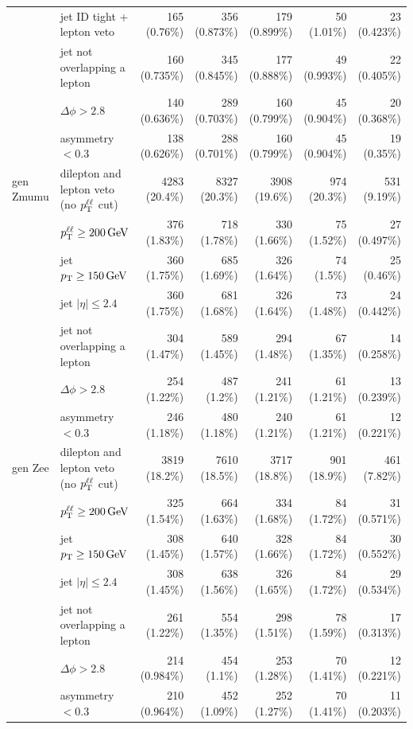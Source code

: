 \begin{tabular}{llrrrrr}
 & jet ID tight + lepton veto & 165 (0.76\%) & 356 (0.873\%) & 179 (0.899\%) & 50 (1.01\%) & 23 (0.423\%) \\
 & jet not overlapping a lepton & 160 (0.735\%) & 345 (0.845\%) & 177 (0.888\%) & 49 (0.993\%) & 22 (0.405\%) \\
 & $\Delta\phi > 2.8$ & 140 (0.636\%) & 289 (0.703\%) & 160 (0.799\%) & 45 (0.904\%) & 20 (0.368\%) \\
 & asymmetry $< 0.3$ & 138 (0.626\%) & 288 (0.701\%) & 160 (0.799\%) & 45 (0.904\%) & 19 (0.35\%) \\
\midrule
gen Zmumu & dilepton and lepton veto (no $p_{\mathrm{T}}^{\ell\ell}$ cut) & 4283 (20.4\%) & 8327 (20.3\%) & 3908 (19.6\%) & 974 (20.3\%) & 531 (9.19\%) \\
 & $p_{\mathrm{T}}^{\ell\ell} \geq 200\,\mathrm{GeV}$ & 376 (1.83\%) & 718 (1.78\%) & 330 (1.66\%) & 75 (1.52\%) & 27 (0.497\%) \\
 & jet $p_{\mathrm{T}} \geq 150\,\mathrm{GeV}$ & 360 (1.75\%) & 685 (1.69\%) & 326 (1.64\%) & 74 (1.5\%) & 25 (0.46\%) \\
 & jet $|\eta| \leq 2.4$ & 360 (1.75\%) & 681 (1.68\%) & 326 (1.64\%) & 73 (1.48\%) & 24 (0.442\%) \\
 & jet not overlapping a lepton & 304 (1.47\%) & 589 (1.45\%) & 294 (1.48\%) & 67 (1.35\%) & 14 (0.258\%) \\
 & $\Delta\phi > 2.8$ & 254 (1.22\%) & 487 (1.2\%) & 241 (1.21\%) & 61 (1.21\%) & 13 (0.239\%) \\
 & asymmetry $< 0.3$ & 246 (1.18\%) & 480 (1.18\%) & 240 (1.21\%) & 61 (1.21\%) & 12 (0.221\%) \\
\midrule
gen Zee & dilepton and lepton veto (no $p_{\mathrm{T}}^{\ell\ell}$ cut) & 3819 (18.2\%) & 7610 (18.5\%) & 3717 (18.8\%) & 901 (18.9\%) & 461 (7.82\%) \\
 & $p_{\mathrm{T}}^{\ell\ell} \geq 200\,\mathrm{GeV}$ & 325 (1.54\%) & 664 (1.63\%) & 334 (1.68\%) & 84 (1.72\%) & 31 (0.571\%) \\
 & jet $p_{\mathrm{T}} \geq 150\,\mathrm{GeV}$ & 308 (1.45\%) & 640 (1.57\%) & 328 (1.66\%) & 84 (1.72\%) & 30 (0.552\%) \\
 & jet $|\eta| \leq 2.4$ & 308 (1.45\%) & 638 (1.56\%) & 326 (1.65\%) & 84 (1.72\%) & 29 (0.534\%) \\
 & jet not overlapping a lepton & 261 (1.22\%) & 554 (1.35\%) & 298 (1.51\%) & 78 (1.59\%) & 17 (0.313\%) \\
 & $\Delta\phi > 2.8$ & 214 (0.984\%) & 454 (1.1\%) & 253 (1.28\%) & 70 (1.41\%) & 12 (0.221\%) \\
 & asymmetry $< 0.3$ & 210 (0.964\%) & 452 (1.09\%) & 252 (1.27\%) & 70 (1.41\%) & 11 (0.203\%) \\

\end{tabular}
